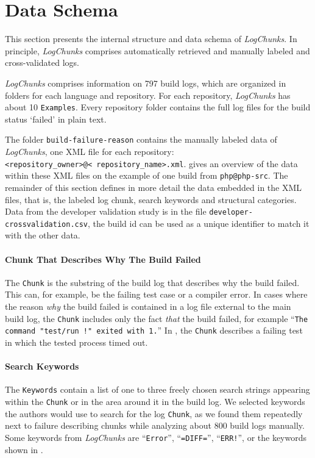 \documentclass[sigconf]{acmart}
\newcommand{\logchunks}{\emph{LogChunks}\xspace}
\begin{document}
\section{Data Schema}
\label{sec:data-schema}

This section presents the internal structure and data schema of
\logchunks. In principle, \logchunks comprises automatically
retrieved and manually labeled and cross-validated logs.

\logchunks comprises information on 797 build logs, which are organized in folders for each language and repository.
For each repository, \logchunks has about 10 \texttt{Examples}. Every repository folder contains the full log files for the build status `failed' in plain text.

The folder \texttt{build-failure-reason} contains the manually labeled
data of \logchunks, one XML file for each repository: \\
\texttt{\textless repository\_owner\textgreater @\textless
  repository\_name\textgreater.xml}.   gives
an overview of the data within these XML files on the example of one
build from \texttt{php@php-src}. The remainder of this section defines
in more detail the data embedded in the XML files, that is, the
labeled log chunk, search keywords and structural categories. Data from the developer validation study is in the file \texttt{developer-crossvalidation.csv}, the build id can be used as a unique identifier to match it with the other data.

\paragraph{Chunk That Describes Why The Build Failed}
The \texttt{Chunk} is the substring of the build log that describes why the build failed.
This can, for example, be the failing test case or a compiler error.
In cases where the reason \emph{why} the build failed is contained in a log file external to the main build log, the \texttt{Chunk} includes only the fact \emph{that} the build failed, for example ``\texttt{The command "test/run !" exited with 1.}''
In , the \texttt{Chunk} describes a failing test in which the tested process timed out.

\paragraph{Search Keywords}
The \texttt{Keywords} contain a list of one to three freely chosen search strings appearing within the \texttt{Chunk} or in the area around it in the build log.
We selected keywords the authors would use to search for the log \texttt{Chunk}, as we found them repeatedly next to failure describing chunks while analyzing about 800 build logs manually.
Some keywords from \logchunks are  ``\texttt{Error}'', ``\texttt{=DIFF=}'', ``\texttt{ERR!}'', or the keywords shown in .
\end{document}
